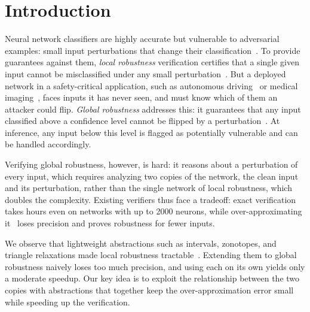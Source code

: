 %
\chapter{Introduction}
\label{ch:introduction}

Neural network classifiers are highly accurate but vulnerable to
adversarial examples: small input perturbations that change their
classification~\cite{szegedy2014,carlini2017,madry2018}. To provide
guarantees against them, \emph{local robustness} verification
certifies that a single given input cannot be misclassified under any
small
perturbation~\cite{katz2017reluplex,gehr2018,singh2019,wang2021}. But
a deployed network in a safety-critical application, such as
autonomous driving~\cite{eykholt2018} or medical
imaging~\cite{finlayson2019}, faces inputs it has never seen, and must
know which of them an attacker could flip. \emph{Global robustness}
addresses this: it guarantees that any input classified above a
confidence level cannot be flipped by a
perturbation~\cite{leino2021gloro,kabaha2024vhagar,athavale2024}. At
inference, any input below this level is flagged as potentially
vulnerable and can be handled accordingly.

Verifying global robustness, however, is hard: it reasons about a
perturbation of every input, which requires analyzing two copies of
the network, the clean input and its perturbation, rather than the
single network of local robustness, which doubles the complexity.
Existing verifiers thus face a tradeoff: exact
verification~\cite{kabaha2024vhagar} takes hours even on networks with
up to 2000 neurons, while over-approximating
it~\cite{athavale2024} loses precision and proves robustness for fewer
inputs.

We observe that lightweight abstractions such as intervals, zonotopes,
and triangle relaxations made local robustness
tractable~\cite{liu2021algorithms}. Extending them to global
robustness naively loses too much precision, and using each on its own
yields only a moderate speedup. Our key idea is to exploit the
relationship between the two copies with abstractions that together
keep the over-approximation error small while speeding up the
verification.

